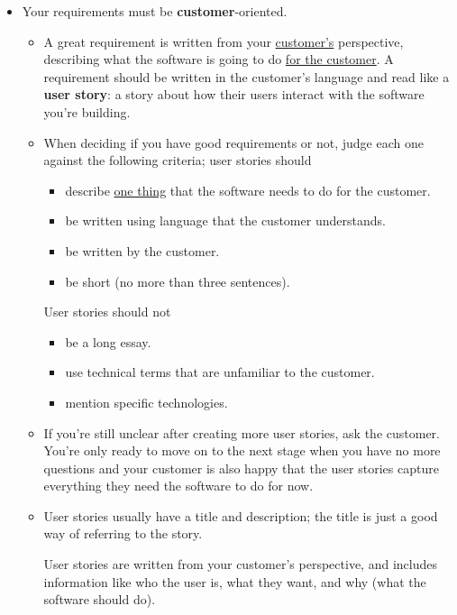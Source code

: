 \documentclass[letterpaper]{article}
\begin{document}
\begin{itemize}
    \item Your requirements must be \textbf{customer}-oriented.
    \begin{itemize}
        \item A great requirement is written from your \underline{customer's} perspective, describing what the software is going to do \underline{for the customer}. A requirement should be written in the customer's language and read like a \textbf{user story}: a story about how their users interact with the software you're building. 
        \item When deciding if you have good requirements or not, judge each one against the following criteria; user stories should 
        \begin{itemize}
            \item describe \underline{one thing} that the software needs to do for the customer. 
            \item be written using language that the customer understands. 
            \item be written by the customer. 
            \item be short (no more than three sentences).
        \end{itemize}
        User stories should not 
        \begin{itemize}
            \item be a long essay. 
            \item use technical terms that are unfamiliar to the customer.
            \item mention specific technologies. 
        \end{itemize} 

        \item If you're still unclear after creating more user stories, ask the customer. You're only ready to move on to the next stage when you have no more questions and your customer is also happy that the user stories capture everything they need the software to do for now. 
        \item User stories usually have a title and description; the title is just a good way of referring to the story. 
        
        \begin{mdframed}
            User stories are written from your customer's perspective, and includes information like who the user is, what they want, and why (what the software should do). 

            \bigskip 


\end{mdframed}
\end{itemize}
\end{itemize}
\end{document}
